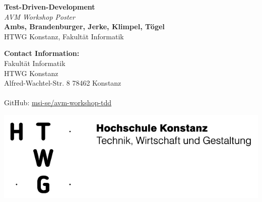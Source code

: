 \documentclass[a0,landscape]{a0poster}
\begin{document}


\begin{minipage}[b]{0.55\linewidth}
\huge \color{NavyBlue} \textbf{Test-Driven-Development} \color{Black}\\ %
\huge\textit{AVM Workshop Poster}\\[1cm] %
\huge \textbf{Ambs, Brandenburger, Jerke, Klimpel, Tögel}\\ %
\huge HTWG Konstanz, Fakultät Informatik\\ %
\end{minipage}
%
\begin{minipage}[b]{0.25\linewidth}
\color{DarkSlateGray}\Large \textbf{Contact Information:}\\
Fakultät Informatik\\ %
HTWG Konstanz\\
Alfred-Wachtel-Str. 8 78462 Konstanz\\\\
GitHub: \href{https://github.com/msi-se/avm-workshop-tdd}{msi-se/avm-workshop-tdd}\\
\end{minipage}
%
\begin{minipage}[b]{0.19\linewidth}
\includegraphics[width=20cm]{logo200.jpg} %
\end{minipage}
\end{document}
